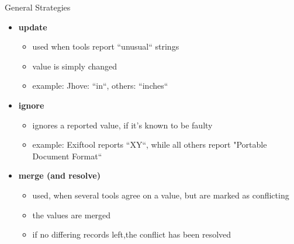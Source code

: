 \documentclass{beamer}
\begin{document}
\begin{frame}{General Strategies}

   \begin{itemize}
   \item \textbf{update}
   \begin{itemize}
	   \item used when tools report ``unusual`` strings
	   \item value is simply changed
	   \item example: Jhove: ``in``, others: ``inches``
   \end{itemize}
   \item \textbf{ignore}
   \begin{itemize}
   		\item ignores a reported value, if it's known to be faulty
   		\item example: Exiftool reports ``XY``, while all others report "Portable Document Format``
   \end{itemize}
   \item \textbf{merge (and resolve)} 
   \begin{itemize}
   		\item used, when several tools agree on a value, but are marked as conflicting
   		\item the values are merged
   		\item if no differing records left,the conflict has been resolved
   \end{itemize}
   \end{itemize}
  
\note{

}
\end{frame}
\end{document}
